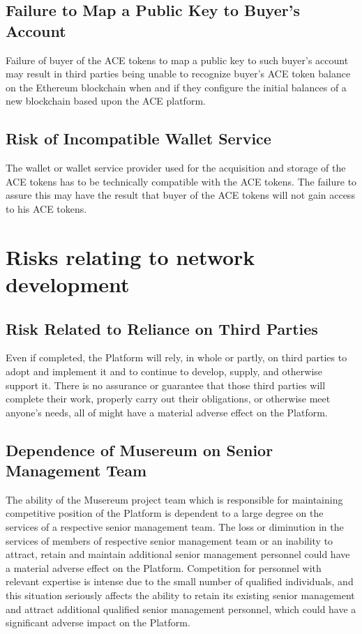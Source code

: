 \documentclass[12pt]{report}
\begin{document}
\begin{multicols}{2}
\subsection{Failure to Map a Public Key to Buyer’s Account}
Failure of buyer of the ACE tokens to map a public key to such buyer’s account may result in third parties being unable to recognize buyer’s ACE token balance on the Ethereum blockchain when and if they configure the initial balances of a new blockchain based upon the ACE platform.

\subsection{Risk of Incompatible Wallet Service}
The wallet or wallet service provider used for the acquisition and storage of the ACE tokens has to be technically compatible with the ACE tokens. The failure to assure this may have the result that buyer of the ACE tokens will not gain access to his ACE tokens.

\section{Risks relating to network development}
\subsection{Risk Related to Reliance on Third Parties}
Even if completed, the Platform will rely, in whole or partly, on third parties to adopt and implement it and to continue to develop, supply, and otherwise support it. There is no assurance or guarantee that those third parties will complete their work, properly carry out their obligations, or otherwise meet anyone’s needs, all of might have a material adverse effect on the Platform.

\subsection{Dependence of Musereum on Senior Management Team}
The ability of the Musereum project team which is responsible for maintaining competitive position of the Platform is dependent to a large degree on the services of a respective senior management team. The loss or diminution in the services of members of respective senior management team or an inability to attract, retain and maintain additional senior management personnel could have a material adverse effect on the Platform. Competition for personnel with relevant expertise is intense due to the small number of qualified individuals, and this situation seriously affects the ability to retain its existing senior management and attract additional qualified senior management personnel, which could have a significant adverse impact on the Platform.


\end{multicols}
\end{document}
